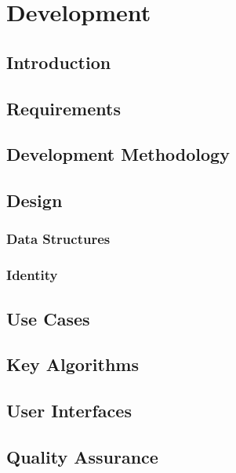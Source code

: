 \chapter{Development}
\section{Introduction}

\section{Requirements}

\section{Development Methodology}

\section{Design}
\subsection{Data Structures}




\subsection{Identity}

\section{Use Cases}

\section{Key Algorithms}

\section{User Interfaces}

\section{Quality Assurance}

